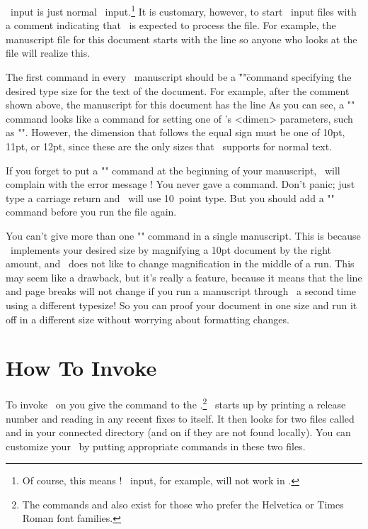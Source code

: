 \ytex\ input is just normal \tex\ input.\footnote*{Of course,
this means !  \tbase\ input, for example, will not work in
\ytex.}  It is customary, however, to start \ytex\ input files
with a comment indicating that \ytex\ is expected to process the
file.  For example, the manuscript file for this document starts
with the line
\beginverb
\endverb
so anyone who looks at the file will realize this.

The first command in every \ytex\ manuscript should be a
\="\typesize"\= command specifying the desired type size for the
text of the document.  For example, after the comment shown
above, the manuscript for this document has the line
\beginverb
\typesize=11pt
\endverb
As you can see, a "\typesize" command looks like a command for
setting one of \tex's <dimen> parameters, such as "\parindent".
However, the dimension that follows the equal sign must be one
of 10pt, 11pt, or 12pt, since these are the only sizes that
\ytex\ supports for normal text.

If you forget to put a "\typesize" command at the beginning of
your manuscript, \ytex\ will complain with the error message
\beginverb
! You never gave a \typesize command.
\endverb
Don't panic; just type a carriage return and \ytex\ will use
10~point type.  But you should add a "\typesize" command before
you run the file again.

You can't give more than one "\typesize" command in a single
manuscript.  This is because \ytex\ implements your desired size
by magnifying a 10pt document by the right amount, and \tex\ does
not like to change magnification in the middle of a run.  This
may seem like a drawback, but it's really a feature, because it
means that the line and page breaks will not change if you run a
manuscript through \ytex\ a second time using a different
typesize!  So you can proof your document in one size and run it
off in a different size without worrying about formatting
changes.

\section {How To Invoke \ytex}

To invoke \ytex\ on  you give the command  to the
.\footnote*{The commands  and 
also exist for those who prefer the Helvetica or Times Roman font
families.} \ytex\ starts up by printing a release number and
reading in any recent fixes to itself.  It then looks for two
files called  and  in your
connected directory (and on  if they are not
found locally).  You can customize your \ytex\ by putting
appropriate commands in these two files.

